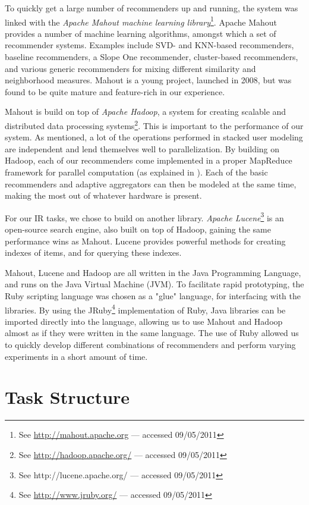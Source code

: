 To quickly get a large number of recommenders up and running,
the system was linked with the \emph{Apache Mahout machine learning library}\footnote{
See \url{http://mahout.apache.org} --- accessed 09/05/2011}. 
Apache Mahout provides a number of machine learning
algorithms, amongst which a set of recommender systems.
Examples include SVD- and KNN-based recommenders,
baseline recommenders, a Slope One recommender,
cluster-based recommenders,
and various generic recommenders for mixing different 
similarity and neighborhood measures.
Mahout is a young project, launched in 2008, 
but was found to be quite mature and feature-rich
in our experience.

Mahout is build on top of \emph{Apache Hadoop},
a system for creating scalable and distributed data processing systems\footnote{
See \url{http://hadoop.apache.org/} --- accessed 09/05/2011}.
This is important to the performance of our system.
As mentioned, a lot of the operations performed in stacked user modeling
are independent and lend themselves well to parallelization.
By building on Hadoop, each of our recommenders come implemented in a 
proper MapReduce framework for parallel computation (as explained in \citet[p75]{Manning2008}).
Each of the basic recommenders and adaptive aggregators can then be modeled at the same time,
making the most out of whatever hardware is present.

For our IR tasks, we chose to build on another library.
\emph{Apache Lucene}\footnote{
See http://lucene.apache.org/ --- accessed 09/05/2011} is an open-source search engine, also built on top of Hadoop,
gaining the same performance wins as Mahout.
Lucene provides powerful methods for creating indexes of items, and for querying these indexes.

Mahout, Lucene and Hadoop are all written in the Java Programming Language,
and runs on the Java Virtual Machine (JVM).
To facilitate rapid prototyping, the Ruby scripting language was chosen as a "glue" language,
for interfacing with the libraries. 
By using the JRuby\footnote{
See \url{http://www.jruby.org/} --- accessed 09/05/2011} 
implementation of Ruby, Java libraries can be imported directly
into the language, allowing us to use Mahout and Hadoop almost as if they were written in the same language.
The use of Ruby allowed us to quickly develop different combinations of recommenders and
perform varying experiments in a short amount of time.

\section{Task Structure}

